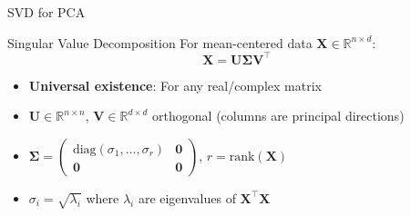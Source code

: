 \documentclass{beamer}
\begin{document}
\begin{frame}{SVD for PCA}
    \begin{block}{Singular Value Decomposition}
        For mean-centered data $\mathbf{X} \in \mathbb{R}^{n \times d}$:
        \[
        \mathbf{X} = \mathbf{U}\mathbf{\Sigma}\mathbf{V}^\top
        \]
        \begin{itemize}
            \item \textbf{Universal existence}: For any real/complex matrix
            \item $\mathbf{U} \in \mathbb{R}^{n \times n}$, $\mathbf{V} \in \mathbb{R}^{d \times d}$ orthogonal (columns are principal directions)
            \item $\mathbf{\Sigma} = \begin{pmatrix}
                \text{diag}(\sigma_1, \ldots, \sigma_r) & \mathbf{0} \\
                \mathbf{0} & \mathbf{0}
            \end{pmatrix}$, $r = \text{rank}(\mathbf{X})$
            \item $\sigma_i = \sqrt{\lambda_i}$ where $\lambda_i$ are eigenvalues of $\mathbf{X}^\top\mathbf{X}$
        \end{itemize}
    \end{block}
\end{frame}





\end{document}
